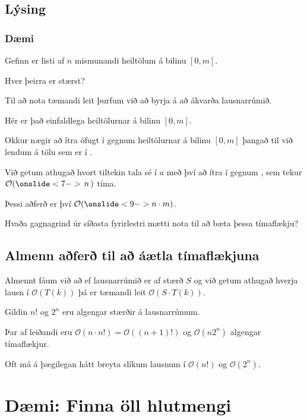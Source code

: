 \subsection{Lýsing}
{
    \frametitle{Dæmi}
    {
        \item<1-> Gefinn er listi  af $n$ mismunandi heiltölum á bilinu $[0, m]$.
        \item<2-> Hver þeirra er stærst?
        \item<3-> Til að nota tæmandi leit þurfum við að byrja á að ákvarða lausnarrúmið.
        \item<4-> Hér er það einfaldlega heiltölurnar á bilinu $[0, m]$.
        \item<5-> Okkur nægir að ítra öfugt í gegnum heiltölurnar á bilinu $[0, m]$ þangað til við lendum á tölu sem er í .
        \item<6-> Við getum athugað hvort tiltekin tala sé í $a$ með því að ítra í gegnum ,
            sem tekur $\mathcal{O}(\onslide<7->{\,n\,})$ tíma.
        \item<8-> Þessi aðferð er því $\mathcal{O}(\onslide<9->{n \cdot m})$.
        \item<10-> Hvaða gagnagrind úr síðasta fyrirlestri mætti nota til að bæta þessa tímaflækju?
    }
}

\subsection{Almenn aðferð til að áætla tímaflækjuna}
{
    {
        \item<1-> Almennt fáum við að ef lausnarrúmið er af stærð $S$ og við getum athugað hverja lausn í $\mathcal{O}(T(k))$
            þá er tæmandi leit $\mathcal{O}(S \cdot T(k))$.
        \item<2-> Gildin $n!$ og $2^n$ eru algengar stærðir á lausnarrúmum.
        \item<3-> Þar af leiðandi eru $\mathcal{O}(n \cdot n!) = \mathcal{O}((n + 1)!)$ og $\mathcal{O}(n 2^n)$ algengar tímaflækjur.
        \item<4-> Oft má á þægilegan hátt breyta slíkum lausnum í $\mathcal{O}(n!)$ og $\mathcal{O}(2^n)$.
    }
}

\section{Dæmi: Finna öll hlutmengi}

